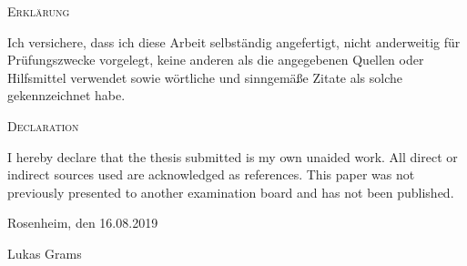 {
\large
\thispagestyle{empty}
\vspace*{\fill}

\noindent
\textsc{Erklärung}

\medskip

\noindent
Ich versichere, dass ich diese Arbeit selbständig angefertigt, nicht anderweitig für Prüfungszwecke vorgelegt, 
keine anderen als die angegebenen Quellen oder Hilfsmittel verwendet sowie wörtliche und
sinngemäße Zitate als solche gekennzeichnet habe.

\bigskip

\noindent
\textsc{Declaration}

\medskip

\noindent
I hereby declare that the thesis submitted is my own unaided work. 
All direct or indirect sources used are acknowledged as references. 
This paper was not previously presented to another examination board and has not been published.

\bigskip

\noindent
Rosenheim, den 16.08.2019

\vspace*{2cm}

\noindent
Lukas Grams
}